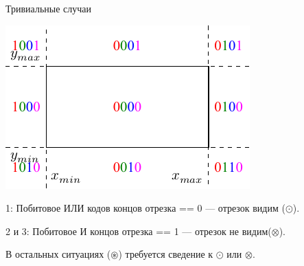 \documentclass[10pt]{beamer}
\begin{document}
	\begin{frame}{Тривиальные случаи}

		
			\begin{center}
				\includegraphics[page=2]{koen-saz.pdf}
			\end{center}
			
			1: Побитовое ИЛИ кодов концов отрезка == 0 --- отрезок видим ($\odot$).
			
			2 и 3: Побитовое И концов отрезка == 1 --- отрезок не видим($\otimes$).
			
			В остальных ситуациях ($\circledast$) требуется сведение к $\odot$ или  $\otimes$.
		
		
		
	\end{frame}
	
\end{document}
